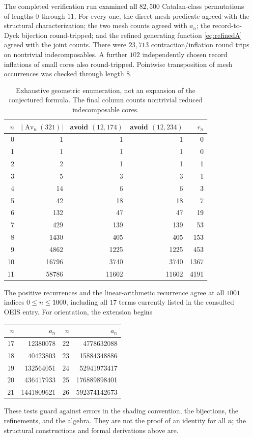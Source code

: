 \documentclass[11pt,a4paper]{article}
\theoremstyle{definition}
\theoremstyle{remark}
\newcommand{\Av}{\operatorname{Av}}
\begin{document}
The completed verification run examined all $82{,}500$ Catalan-class
permutations of lengths $0$ through $11$. For every one, the direct mesh
predicate agreed with the structural characterization; the two mesh counts
agreed with $a_n$; the record-to-Dyck bijection round-tripped; and the
refined generating function \eqref{eq:refinedA} agreed with the joint
counts. There were $23{,}713$ contraction/inflation round trips on
nontrivial indecomposables. A further $102$ independently chosen record
inflations of small cores also round-tripped. Pointwise transposition of
mesh occurrences was checked through length $8$.

\begin{table}[ht]
\centering
\small
\begin{tabular}{r r r r r}
\toprule
$n$ & $|\Av_n(321)|$ & avoid $(12,174)$ & avoid $(12,234)$ & $r_n$\\
\midrule
0 & 1 & 1 & 1 & 0\\
1 & 1 & 1 & 1 & 0\\
2 & 2 & 1 & 1 & 1\\
3 & 5 & 3 & 3 & 1\\
4 & 14 & 6 & 6 & 3\\
5 & 42 & 18 & 18 & 7\\
6 & 132 & 47 & 47 & 19\\
7 & 429 & 139 & 139 & 53\\
8 & 1430 & 405 & 405 & 153\\
9 & 4862 & 1225 & 1225 & 453\\
10 & 16796 & 3740 & 3740 & 1367\\
11 & 58786 & 11602 & 11602 & 4191\\
\bottomrule
\end{tabular}
\caption{Exhaustive geometric enumeration, not an expansion of the conjectured
formula. The final column counts nontrivial reduced indecomposable cores.}
\label{tab:exhaustive}
\end{table}

The positive recurrences and the linear-arithmetic recurrence agree at all
$1001$ indices $0\leq n\leq1000$, including all $17$ terms currently
listed in the consulted OEIS entry. For orientation, the extension begins
\begin{center}
\begin{tabular}{r r@{\qquad}r r}
\toprule
$n$ & $a_n$ & $n$ & $a_n$\\
\midrule
17 & 12380078 & 22 & 4778632088\\
18 & 40423803 & 23 & 15884348886\\
19 & 132564051 & 24 & 52941973417\\
20 & 436417933 & 25 & 176889898401\\
21 & 1441809621 & 26 & 592374142673\\
\bottomrule
\end{tabular}
\end{center}
These tests guard against errors in the shading convention, the bijections,
the refinements, and the algebra. They are not the proof of an identity
for all $n$; the structural constructions and formal derivations above are.
\end{document}
